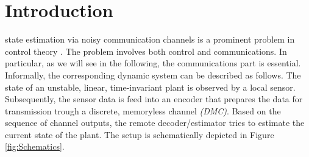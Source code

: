 \documentclass[conference]{IEEEtran}
\begin{document}
\section{Introduction}	\label{sec:Introduction}
	 state estimation via noisy communication channels is a prominent problem in control theory 
	\cite{MS07, MS07SC, S06, SP03}. 
	The problem involves both control and communications. In particular, as we will see in the following, the communications part is essential.  
	Informally, the corresponding dynamic system can be described as follows. The state of an unstable, linear, time-invariant plant is observed by a local sensor. 
	Subsequently, the sensor data is feed into an encoder that prepares the data for transmission trough a discrete, memoryless channel \emph{(DMC)}. 
	Based on the sequence of channel outputs, the remote decoder/estimator tries to estimate the current state of the plant. The setup is schematically depicted in Figure \ref{fig:Schematics}.
\end{document}
